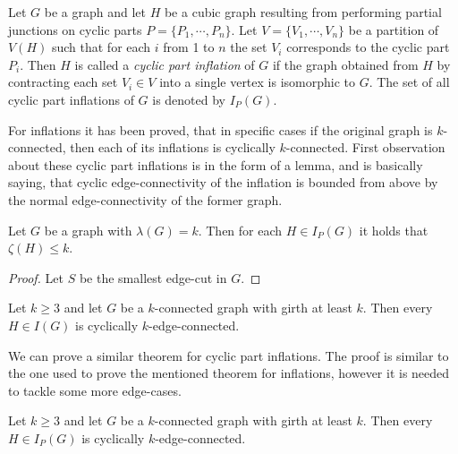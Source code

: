 \documentclass[12pt, twoside]{book}
\begin{document}
\begin{definition}
	\label{def:cyclic-part-inflation}
	Let $G$ be a graph and let $H$ be a cubic graph resulting from performing partial junctions on cyclic parts $P=\{P_1,\cdots,P_n\}$. Let $V=\{V_1,\cdots, V_n\}$ be a partition of $V(H)$ such that for each $i$ from 1 to $n$ the set $V_i$ corresponds to the cyclic part $P_i$. Then $H$ is called a \textit{cyclic part inflation} of $G$ if the graph obtained from $H$ by contracting each set $V_i\in V$ into a single vertex is isomorphic to $G$. The set of all cyclic part inflations of $G$ is denoted by $I_P(G)$.
\end{definition}

For inflations it has been proved, that in specific cases if the original graph is $k$-connected, then each of its inflations is cyclically $k$-connected. First observation about these cyclic part inflations is in the form of a lemma, and is basically saying, that cyclic edge-connectivity of the inflation is bounded from above by the normal edge-connectivity of the former graph.

\begin{lemma}
	Let $G$ be a graph with $\lambda(G)=k$. Then for each $H\in I_P(G)$ it holds that $\zeta(H)\leq k$.
\end{lemma}

\begin{proof}
	Let $S$ be the smallest edge-cut in $G$. 
\end{proof}

\begin{theorem}
	Let $k \geq 3$ and let $G$ be a $k$-connected graph with girth at least $k$. Then every $H \in I(G)$ is cyclically $k$-edge-connected.
\end{theorem}

We can prove a similar theorem for cyclic part inflations. The proof is similar to the one used to prove the mentioned theorem for inflations, however it is needed to tackle some more edge-cases.

\begin{theorem}
	Let $k\geq 3$ and let $G$ be a $k$-connected graph with girth at least $k$. Then every  $H\in I_P(G)$ is cyclically $k$-edge-connected.
\end{theorem}
\end{document}
